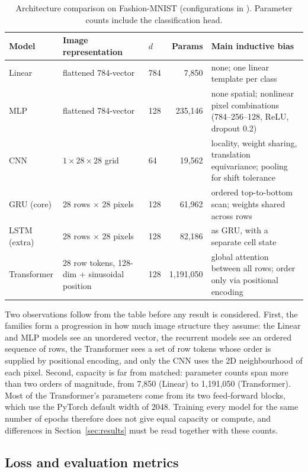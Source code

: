 \begin{table}[htbp]
\centering\small
\caption[Architecture comparison on Fashion-MNIST]{Architecture comparison on Fashion-MNIST (configurations in
). Parameter counts
include the classification head.}
\label{tab:arch-comparison}
\begin{tabularx}{\linewidth}{p{17mm}p{25mm}p{12mm}rY}
\toprule
Model & Image representation & $d$ & Params & Main inductive bias\\\midrule
Linear & flattened 784-vector & 784 & 7,850 & none; one linear template per class\\
MLP & flattened 784-vector & 128 & 235,146 & none spatial; nonlinear pixel combinations (784--256--128, ReLU, dropout 0.2)\\
CNN & $1\times28\times28$ grid & 64 & 19,562 & locality, weight sharing, translation equivariance; pooling for shift tolerance\\
GRU (core) & 28 rows $\times$ 28 pixels & 128 & 61,962 & ordered top-to-bottom scan; weights shared across rows\\
LSTM (extra) & 28 rows $\times$ 28 pixels & 128 & 82,186 & as GRU, with a separate cell state\\
Transformer & 28 row tokens, 128-dim + sinusoidal position & 128 & 1,191,050 & global attention between all rows; order only via positional encoding\\
\bottomrule
\end{tabularx}
\end{table}

Two observations follow from the table before any result is considered. First,
the families form a progression in how much image structure they assume: the
Linear and MLP models see an unordered vector, the recurrent models see an
ordered sequence of rows, the Transformer sees a set of row tokens whose order
is supplied by positional encoding, and only the CNN uses the 2D neighbourhood
of each pixel. Second, capacity is far from matched: parameter counts span more
than two orders of magnitude, from 7,850 (Linear) to 1,191,050 (Transformer).
Most of the Transformer's parameters come from its two feed-forward blocks,
which use the PyTorch default width of 2048. Training every model for the same
number of epochs therefore does not give equal capacity or compute, and
differences in Section~\ref{sec:results} must be read together with these counts.

\subsection{Loss and evaluation metrics}
\label{sec:metrics}

